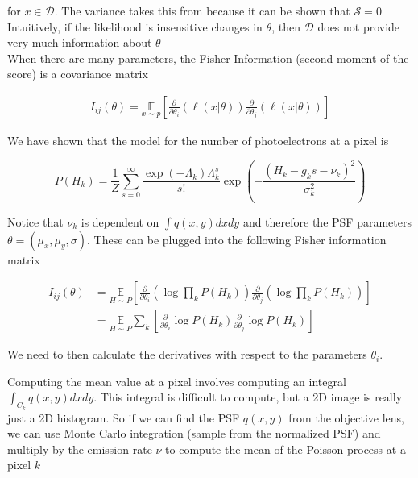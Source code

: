 \documentclass{article}
\begin{document}
for $x\in\mathcal{D}$. The variance takes this from because it can be shown that $\mathcal{S}=0$\\
\vspace{0.1in}
Intuitively, if the likelihood is insensitive changes in $\theta$, then $\mathcal{D}$ does not provide very much information about $\theta$\\

When there are many parameters, the Fisher Information (second moment of the score) is a covariance matrix

\begin{align*}
I_{ij}(\theta) = \underset{{x\sim p}}{\mathbb{E}}\left[\frac{\partial}{\partial\theta_{i}} \left(\ell(x|\theta)\right)\frac{\partial}{\partial\theta_{j}} \left(\ell(x|\theta)\right)\right]
\end{align*}




We have shown that the model for the number of photoelectrons at a pixel is

\begin{equation*}
P(H_{k}) = \frac{1}{Z}\sum_{s=0}^{\infty}\frac{\exp\left({-\Lambda_{k}}\right)\Lambda_{k}^{s}}{s!}\exp\left(-\frac{(H_{k}-g_{k}s-\nu_{k})^{2}}{\sigma_{k}^{2}}\right)
\end{equation*}

Notice that $\nu_{k}$ is dependent on $\int q(x,y)dxdy$ and therefore the PSF parameters $\theta = (\mu_{x},\mu_{y},\sigma)$. These can be plugged into the following Fisher information matrix

\begin{align*}
I_{ij}(\theta) &= \underset{{H\sim P}}{\mathbb{E}}\left[\frac{\partial}{\partial\theta_{i}} \left(\log \prod_{k} P(H_{k})\right)\frac{\partial}{\partial\theta_{j}} \left(\log \prod_{k} P(H_{k})\right)\right]\\
&= \underset{{H\sim P}}{\mathbb{E}}\sum_{k}\left[\frac{\partial}{\partial\theta_{i}} \log P(H_{k})\frac{\partial}{\partial\theta_{j}} \log P(H_{k})\right]
\end{align*}

We need to then calculate the derivatives with respect to the parameters $\theta_{i}$. 

Computing the mean value at a pixel involves computing an integral $ \int_{C_{k}} q(x,y)dxdy$. This integral is difficult to compute, but a 2D image is really just a 2D histogram. So if we can find the PSF $q(x,y)$ from the objective lens, we can use Monte Carlo integration (sample from the normalized PSF) and multiply by the emission rate $\nu$ to compute the mean of the Poisson process at a pixel $k$
\end{document}

